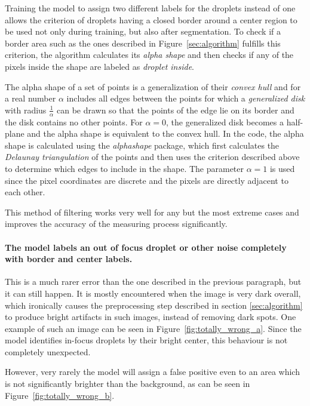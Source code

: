 Training the model to assign two different labels for the droplets instead of one allows the criterion of droplets having a closed border around a center region to be used not only during training, but also after segmentation.
To check if a border area such as the ones described in Figure~\ref{sec:algorithm} fulfills this criterion, the algorithm calculates its \emph{alpha shape}\cite{edelsbrunnerShapeSetPoints1983a} and then checks if any of the pixels inside the shape are labeled as \emph{droplet inside}.

The alpha shape of a set of points is a generalization of their \emph{convex hull} and for a real number $\alpha$ includes all edges between the points for which a \emph{generalized disk} with radius $\frac{1}{\alpha}$ can be drawn so that the points of the edge lie on its border and the disk contains no other points. For $\alpha=0$, the generalized disk becomes a half-plane and the alpha shape is equivalent to the convex hull. In the code, the alpha shape is calculated using the \emph{alphashape}\cite{bellockBellockkAlphashapeV12021} package, which first calculates the \emph{Delaunay triangulation} of the points and then uses the criterion described above to determine which edges to include in the shape. The parameter $\alpha = 1$ is used since the pixel coordinates are discrete and the pixels are directly adjacent to each other. 

This method of filtering works very well for any but the most extreme cases and improves the accuracy of the measuring process significantly.

\paragraph{The model labels an out of focus droplet or other noise completely with border and center labels.}

This is a much rarer error than the one described in the previous paragraph, but it can still happen. 
It is mostly encountered when the image is very dark overall, which ironically causes the preprocessing step described in section \ref{sec:algorithm} to produce bright artifacts in such images, instead of removing dark spots. 
One example of such an image can be seen in Figure~\ref{fig:totally_wrong_a}.
Since the model identifies in-focus droplets by their bright center, this behaviour is not completely unexpected.

However, very rarely the model will assign a false positive even to an area which is not significantly brighter than the background, as can be seen in Figure~\ref{fig:totally_wrong_b}.

